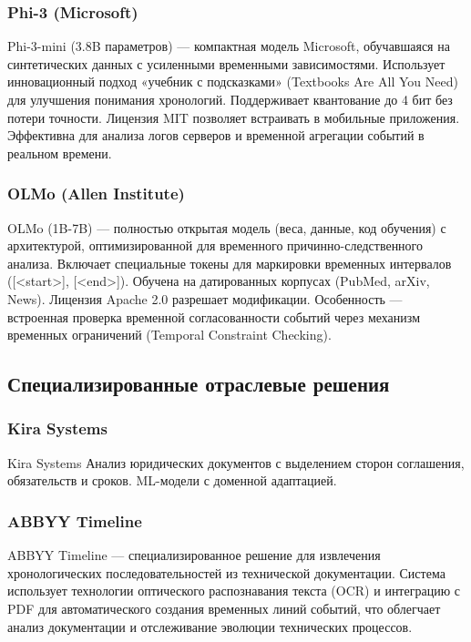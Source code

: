 \subsubsection{Phi-3 (Microsoft)}
Phi-3-mini (3.8B параметров) \cite{lib:phi} — компактная модель Microsoft, обучавшаяся на синтетических данных с усиленными временными зависимостями. Использует инновационный подход «учебник с подсказками» (Textbooks Are All You Need) для улучшения понимания хронологий. Поддерживает квантование до 4 бит без потери точности. Лицензия MIT позволяет встраивать в мобильные приложения. Эффективна для анализа логов серверов и временной агрегации событий в реальном времени.

\subsubsection{OLMo (Allen Institute)}
OLMo (1B-7B) \cite{lib:olmo} — полностью открытая модель (веса, данные, код обучения) с архитектурой, оптимизированной для временного причинно-следственного анализа. Включает специальные токены для маркировки временных интервалов ([\textless start\textgreater], [\textless end\textgreater ]). Обучена на датированных корпусах (PubMed, arXiv, News). Лицензия Apache 2.0 разрешает модификации. Особенность — встроенная проверка временной согласованности событий через механизм временных ограничений (Temporal Constraint Checking).

\subsection{Специализированные отраслевые решения}

\subsubsection{Kira Systems}
Kira Systems \cite{lib:kira}  Анализ юридических документов с выделением сторон соглашения, обязательств и сроков. ML-модели с доменной адаптацией.

\subsubsection{ABBYY Timeline}
ABBYY Timeline \cite{lib:ABBYY} — специализированное решение для извлечения хронологических последовательностей из технической документации. Система использует технологии оптического распознавания текста (OCR) и интеграцию с PDF для автоматического создания временных линий событий, что облегчает анализ документации и отслеживание эволюции технических процессов.

